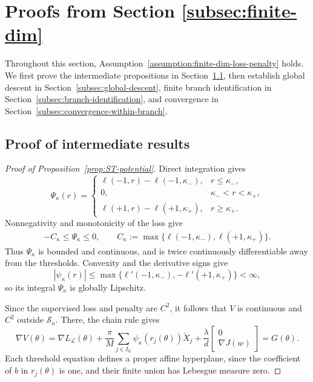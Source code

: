 \section{Proofs from Section \ref{subsec:finite-dim}}
\label{sec:proof-finite-dim}

Throughout this section,
Assumption~\ref{assumption:finite-dim-loss-penalty} holds.
We first prove the intermediate propositions in
Section~\ref{subsec:proof-intermediate-res-finite-dim},
then establish global descent in
Section~\ref{subsec:global-descent}, finite branch identification
in Section~\ref{subsec:branch-identification}, and convergence
in Section~\ref{subsec:convergence-within-branch}.

\subsection{Proof of intermediate results}
\label{subsec:proof-intermediate-res-finite-dim}

\begin{proof}[Proof of Proposition~\ref{prop:ST-potential}]
Direct integration gives
\begin{equation}
    \Psi_\kappa(r)
    =
    \begin{cases}
        \ell(-1,r)-\ell(-1,\kappa_-),
            & r\leq\kappa_-,\\
        0,
            & \kappa_-<r<\kappa_+,\\
        \ell(+1,r)-\ell(+1,\kappa_+),
            & r\geq\kappa_+.
    \end{cases}
    \label{eq:psi-kappa-formula}
\end{equation}
Nonnegativity and monotonicity of the loss give
\begin{align}
    -C_\kappa\leq\Psi_\kappa\leq0,
    \qquad
    C_\kappa:=
    \max\{\ell(-1,\kappa_-),\ell(+1,\kappa_+)\}. \label{eq:c-kappa}
\end{align}
Thus $\Psi_\kappa$ is bounded and continuous, and is twice
continuously differentiable away from the thresholds.
Convexity and the derivative signs give
\[
    |\psi_\kappa(r)|
    \leq
    \max\{\ell'(-1,\kappa_-),-\ell'(+1,\kappa_+)\}
    <\infty,
\]
so its integral $\Psi_\kappa$ is globally Lipschitz.

Since the supervised loss and penalty are $C^2$, it follows that
$V$ is continuous and $C^2$ outside $\mathcal S_\kappa$.
There, the chain rule gives
\[
    \nabla V(\theta)
    =
    \nabla L_{\mathcal L}(\theta)
    +
    \frac{\pi}{M}\sum_{j\in I_{\mathcal U}}
        \psi_\kappa(r_j(\theta))\breve X_j
    +
    \frac{\lambda}{d}
        \begin{bmatrix}0\\\nabla J(w)\end{bmatrix}
    =
    G(\theta).
\]
Each threshold equation defines a proper affine hyperplane,
since the coefficient of $b$ in $r_j(\theta)$ is one, and
their finite union has Lebesgue measure zero.
\end{proof}


